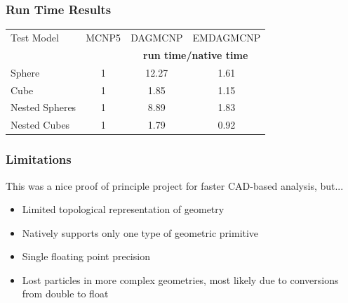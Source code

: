 \documentclass[12pt]{beamer}
\begin{document}
\begin{frame}
\frametitle{Run Time Results}

\begin{table}
  \small
  \begin{center}
    \label{timings}
    \begin{tabular}{lccc}


      \toprule
      Test Model & MCNP5 & DAGMCNP & EMDAGMCNP \\
      & \phantom{a} & \multicolumn{2}{c}{\textbf{run time/native time}} \\
      \hline
      Sphere & 1 & 12.27 & 1.61 \\
      Cube & 1 & 1.85 & 1.15 \\
      Nested Spheres & 1 & 8.89 & 1.83 \\
      Nested Cubes & 1 & 1.79 & 0.92 \\
      \bottomrule

      
    \end{tabular}
  \end{center}
\end{table}


\end{frame}

\begin{frame}
\frametitle{Limitations}

This was a nice proof of principle project for faster CAD-based analysis, but... \\
\vfill
\begin{itemize}
\item Limited topological representation of geometry
\item Natively supports only one type of geometric primitive
\item Single floating point precision
\item Lost particles in more complex geometries, most likely due to conversions from double to float
\end{itemize}
\end{frame}
\end{document}
